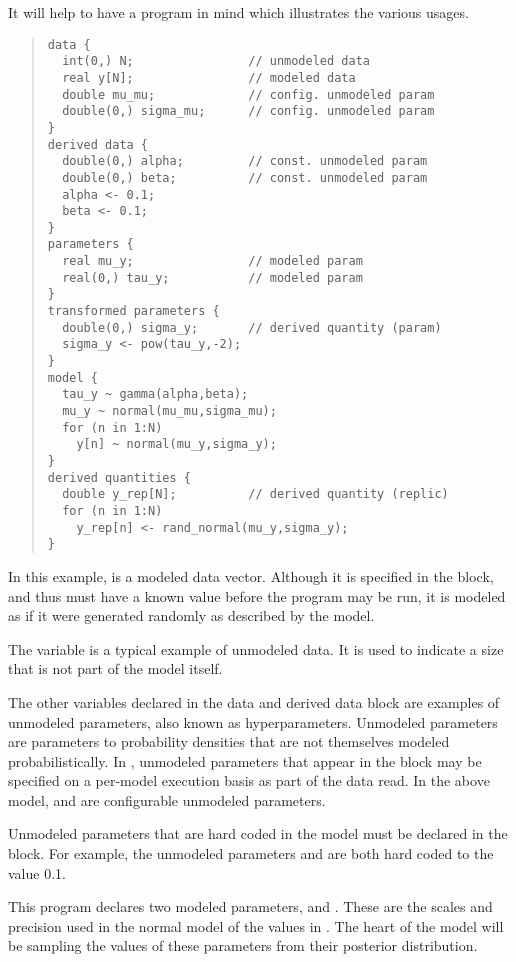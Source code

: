 It will help to have a program in mind which illustrates the various
usages.  
%
\begin{quote}
\begin{Verbatim}
data {
  int(0,) N;                // unmodeled data
  real y[N];                // modeled data
  double mu_mu;             // config. unmodeled param
  double(0,) sigma_mu;      // config. unmodeled param
}
derived data {
  double(0,) alpha;         // const. unmodeled param
  double(0,) beta;          // const. unmodeled param
  alpha <- 0.1;       
  beta <- 0.1;
} 
parameters {
  real mu_y;                // modeled param
  real(0,) tau_y;           // modeled param
} 
transformed parameters {
  double(0,) sigma_y;       // derived quantity (param)
  sigma_y <- pow(tau_y,-2);
}
model {
  tau_y ~ gamma(alpha,beta);
  mu_y ~ normal(mu_mu,sigma_mu);
  for (n in 1:N)
    y[n] ~ normal(mu_y,sigma_y);
}
derived quantities {
  double y_rep[N];          // derived quantity (replic)
  for (n in 1:N)
    y_rep[n] <- rand_normal(mu_y,sigma_y);
}
\end{Verbatim}
\end{quote}
%
In this example,  is a modeled data vector.  Although it is
specified in the  block, and thus must have a known value
before the program may be run, it is modeled as if it were generated
randomly as described by the model.  

The variable  is a typical example of unmodeled data.  It is
used to indicate a size that is not part of the model itself.

The other variables declared in the data and derived data block are
examples of unmodeled parameters, also known as hyperparameters.
Unmodeled parameters are parameters to probability densities that are
not themselves modeled probabilistically.  In \Stan, unmodeled
parameters that appear in the  block may be specified on a
per-model execution basis as part of the data read.  In the above
model,  and  are configurable unmodeled
parameters.  

Unmodeled parameters that are hard coded in the model must 
be declared in the  block.  For example, the
unmodeled parameters  and  are both hard coded
to the value 0.1. 

This program declares two modeled parameters,  and
.  These are the scales and precision used in the normal
model of the values in .  The heart of the model will be
sampling the values of these parameters from their posterior
distribution.

